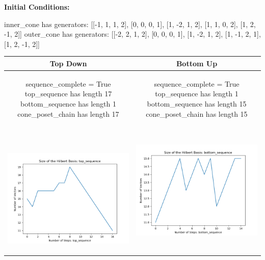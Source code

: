 \documentclass[10pt]{article}
\begin{document}
\textbf{Initial Conditions:}
\begin{SAGE}
inner_cone has generators: 
[[-1, 1, 1, 2], [0, 0, 0, 1], [1, -2, 1, 2], [1, 1, 0, 2], [1, 2, -1, 2]]
outer_cone has generators: 
[[-2, 2, 1, 2], [0, 0, 0, 1], [1, -2, 1, 2], [1, -1, 2, 1], [1, 2, -1, 2]]

\end{SAGE}
\begin{tabular}{c|c}
\textbf{Top Down} & \textbf{Bottom Up} \\ \hline  
\begin{SAGE}
	sequence_complete = True
	top_sequence has length 17
	bottom_sequence has length 1
	cone_poset_chain has length 17
\end{SAGE} 
&
\begin{SAGE}
	sequence_complete = True
	top_sequence has length 1
	bottom_sequence has length 15
	cone_poset_chain has length 15
\end{SAGE} 
\\ \hline
\
\begin{minipage}{.45\textwidth}
\includegraphics[width=\textwidth]{"DATA/4d/5 generators 2 bound D/top_sequence SIZE"}
\end{minipage} &
\begin{minipage}{.45\textwidth}
\includegraphics[width=\textwidth]{"DATA/4d/5 generators 2 bound D bottomup/bottom_sequence SIZE"}

\end{minipage}
\end{tabular}
\end{document}
